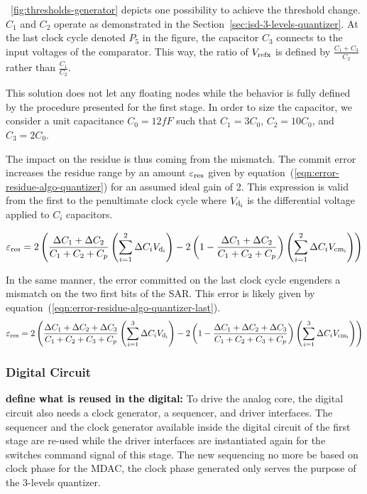 \figurename~\ref{fig:thresholds-generator} depicts one possibility to achieve the threshold change. \(C_1\) and \(C_2\) operate as demonstrated in the Section~\ref{sec:isd-3-levels-quantizer}. At the last clock cycle denoted \(P_5\) in the figure, the capacitor \(C_3\) connects to the input voltages of the comparator. This way, the ratio of \(V_{\rm refx}\) is defined by \(\frac{C_1+C_3}{C_2}\) rather than \(\frac{C_1}{C_2}\).

This solution does not let any floating nodes while the behavior is fully defined by the procedure presented for the first stage. In order to size the capacitor, we consider a unit capacitance \(C_0 = 12 fF\) such that \(C_1 = 3 C_0\), \(C_2 = 10 C_0\), and \(C_3 = 2 C_0\).

The impact on the residue is thus coming from the mismatch. The commit error increases the residue range by an amount \(\varepsilon_{\rm res}\) given by equation~(\ref{eqn:error-residue-algo-quantizer}) for an assumed ideal gain of 2. This expression is valid from the first to the penultimate clock cycle where \(V_{\rm d_i}\) is the differential voltage applied to \(C_i\) capacitors.

\begin{equation}
	\label{eqn:error-residue-algo-quantizer}
	\varepsilon_{\rm res} = 2\left(\frac{\Delta C_1 + \Delta C_2}{C_1+C_2+C_p}\left(\sum_{i=1}^{2}{\Delta C_i V_{\rm d_i}}\right)
	- 2\left(1-\frac{\Delta C_1 + \Delta C_2}{C_1+C_2+C_p}\right)\left(\sum_{i=1}^{2}{\Delta C_i V_{\rm cm_i}}\right)\right)
\end{equation}

In the same manner, the error committed on the last clock cycle engenders a mismatch on the two first bits of the SAR\@. This error is likely given by equation~(\ref{eqn:error-residue-algo-quantizer-last}).
\begin{equation}
	\label{eqn:error-residue-algo-quantizer-last}
	\varepsilon_{\rm res} = 2\left(\frac{\Delta C_1 + \Delta C_2 + \Delta C_3}{C_1+C_2+C_3+C_p}\left(\sum_{i=1}^{3}{\Delta C_i V_{\rm d_i}}\right)
	- 2\left(1-\frac{\Delta C_1 + \Delta C_2 + \Delta C_3}{C_1+C_2+C_3+C_p}\right)\left(\sum_{i=1}^{3}{\Delta C_i V_{\rm cm_i}}\right)\right)
\end{equation}

	\subsubsection{Digital Circuit}         %
\textbf{\textcolor{black}{define what is reused in the digital:}}
To drive the analog core, the digital circuit also needs a clock generator, a sequencer, and driver interfaces. The sequencer and the clock generator available inside the digital circuit of the first stage are re-used while the driver interfaces are instantiated again for the switches command signal of this stage. The new sequencing no more be based on clock phase for the MDAC, the clock phase generated only serves the purpose of the 3-levels quantizer.

